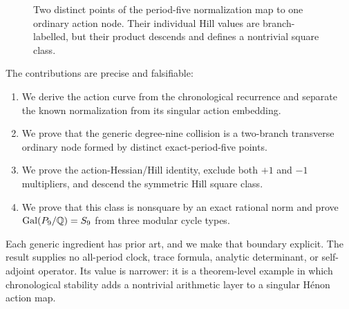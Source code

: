 \begin{figure}[t]
\centering
{}
\caption{Two distinct points of the period-five normalization map to one
ordinary action node.  Their individual Hill values are branch-labelled,
but their product descends and defines a nontrivial square class.}
\label{fig:descent}
\end{figure}

The contributions are precise and falsifiable:

\begin{enumerate}[leftmargin=*,itemsep=2pt]
\item We derive the action curve from the chronological recurrence and
      separate the known normalization from its singular action embedding.
\item We prove that the generic degree-nine collision is a two-branch
      transverse ordinary node formed by distinct exact-period-five points.
\item We prove the action-Hessian/Hill identity, exclude both \(+1\) and
      \(-1\) multipliers, and descend the symmetric Hill square class.
\item We prove that this class is nonsquare by an exact rational norm and
      prove \(\operatorname{Gal}(P_9/\mathbb{Q})=S_9\) from three modular cycle types.
\end{enumerate}

Each generic ingredient has prior art, and we make that boundary explicit.
The result supplies no all-period clock, trace formula, analytic determinant,
or self-adjoint operator.  Its value is narrower: it is a theorem-level
example in which chronological stability adds a nontrivial arithmetic layer
to a singular H\'enon action map.
